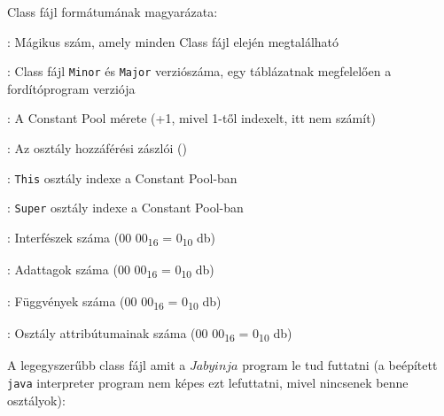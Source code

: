 Class fájl formátumának magyarázata:

\begin{compactitem}
\setlength\itemsep{-5px}
\item {}: Mágikus szám, amely minden Class fájl elején megtalálható
\item {} : Class fájl \lstinline{Minor} és \lstinline{Major} verziószáma, egy táblázatnak megfelelően a fordítóprogram verziója
\item {}: A Constant Pool mérete (+1, mivel 1-től indexelt, itt nem számít)
\item {}: Az osztály hozzáférési zászlói ()
\item {}: \lstinline{This} osztály indexe a Constant Pool-ban
\item {}: \lstinline{Super} osztály indexe a Constant Pool-ban
\item {}: Interfészek száma (00 00\textsubscript{16} = 0\textsubscript{10} db)
\item {}: Adattagok száma (00 00\textsubscript{16} = 0\textsubscript{10} db)
\item {}: Függvények száma (00 00\textsubscript{16} = 0\textsubscript{10} db)
\item {}: Osztály attribútumainak száma (00 00\textsubscript{16} = 0\textsubscript{10} db)
\end{compactitem}

A legegyszerűbb class fájl amit a $Jabyinja$ program le tud futtatni (a beépített \lstinline{java} interpreter program nem képes ezt lefuttatni, mivel nincsenek benne osztályok):

